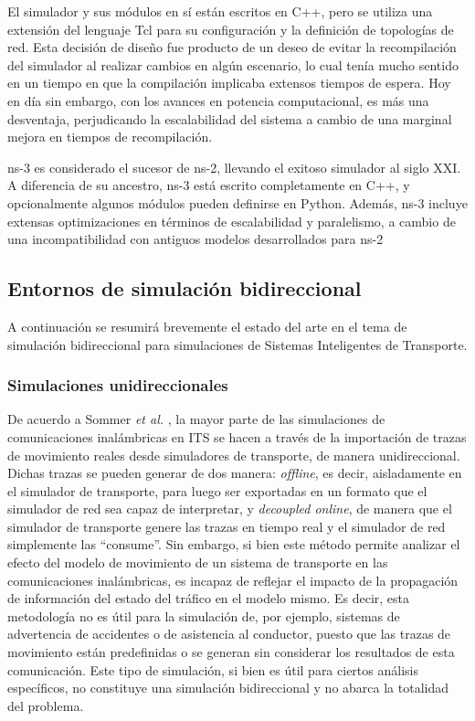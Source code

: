 El simulador y sus módulos en sí están escritos en C++, pero se utiliza una extensión del lenguaje Tcl para su configuración y la definición de topologías de red. Esta decisión de diseño fue producto de un deseo de evitar la recompilación del simulador al realizar cambios en algún escenario, lo cual tenía mucho sentido en un tiempo en que la compilación implicaba extensos tiempos de espera. Hoy en día sin embargo, con los avances en potencia computacional, es más una desventaja, perjudicando la escalabilidad del sistema \autocite{perf_comp_recentnetworksims} a cambio de una marginal mejora en tiempos de recompilación. 

ns-3 es considerado el sucesor de ns-2, llevando el exitoso simulador al siglo XXI. A diferencia de su ancestro, ns-3 está escrito completamente en C++, y opcionalmente algunos módulos pueden definirse en Python. Además, ns-3 incluye extensas optimizaciones en términos de escalabilidad y paralelismo, a cambio de una incompatibilidad con antiguos modelos desarrollados para ns-2

\subsection{Entornos de simulación bidireccional}

A continuación se resumirá brevemente el estado del arte en el tema de simulación bidireccional para simulaciones de Sistemas Inteligentes de Transporte. 

\subsubsection{Simulaciones unidireccionales}

De acuerdo a Sommer \emph{et al.} \autocite{sommer2008need}, la mayor parte de las simulaciones de comunicaciones inalámbricas en ITS se hacen a través de la importación de trazas de movimiento reales desde simuladores de transporte, de manera unidireccional. Dichas trazas se pueden generar de dos manera: \textit{offline}, es decir, aisladamente en el simulador de transporte, para luego ser exportadas en un formato que el simulador de red sea capaz de interpretar, y \textit{decoupled online}, de manera que el simulador de transporte genere las trazas en tiempo real y el simulador de red simplemente las ``consume''. Sin embargo, si bien este método permite analizar el efecto del modelo de movimiento de un sistema de transporte en las comunicaciones inalámbricas, es incapaz de reflejar el impacto de la propagación de información del estado del tráfico en el modelo mismo. Es decir, esta metodología no es útil para la simulación de, por ejemplo, sistemas de advertencia de accidentes o de asistencia al conductor, puesto que las trazas de movimiento están predefinidas o se generan sin considerar los resultados de esta comunicación. Este tipo de simulación, si bien es útil para ciertos análisis específicos, no constituye una simulación bidireccional y no abarca la totalidad del problema.

